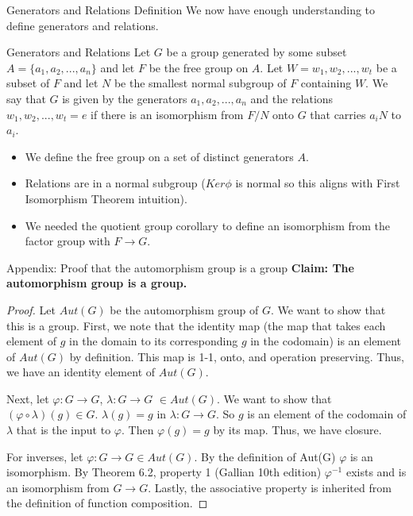 \documentclass{beamer}
\begin{document}
\begin{frame}{Generators and Relations Definition}
    We now have enough understanding to define generators and relations.
    \begin{block}{Generators and Relations}
        Let $G$ be a group generated by some subset $A = \{a_{1}, a_{2}, ..., a_{n}\}$ and let $F$ be the free group on $A$. Let $W = {w_{1}, w_{2}, ..., w_{t}}$ be a subset of $F$ and let $N$ be the smallest normal subgroup of $F$ containing $W$. We say that $G$ is given by the generators $a_{1}, a_{2}, ..., a_{n}$ and the relations $w_{1}, w_{2}, ..., w_{t} = e$ if there is an isomorphism from $F/N$ onto $G$ that carries $a_{i}N$ to $a_{i}$.
    \end{block}

    \pause

    \begin{itemize}
        \item We define the free group on a set of distinct generators $A$.
        \item Relations are in a normal subgroup ($Ker\phi$ is normal so this aligns with First Isomorphism Theorem intuition).
        \item We needed the quotient group corollary to define an isomorphism from the factor group with $F \to G$.
    \end{itemize}
\end{frame}

\begin{frame}{Appendix: Proof that the automorphism group is a group}
\textbf{Claim: The automorphism group is a group.}
    \begin{proof}
        Let $Aut(G)$ be the automorphism group of $G$. We want to show that this is a group. First, we note that the identity map (the map that takes each element of $g$ in the domain to its corresponding $g$ in the codomain) is an element of $Aut(G)$ by definition. This map is 1-1, onto, and operation preserving. Thus, we have an identity element of $Aut(G)$.

        Next, let $\varphi: G \to G$, $\lambda: G \to G$ $\in Aut(G)$. We want to show that $(\varphi \circ \lambda)(g) \in G$. $\lambda (g) = g$ in $\lambda: G \to G$. So $g$ is an element of the codomain of $\lambda$ that is the input to $\varphi$. Then $\varphi(g) = g$ by its map. Thus, we have closure.

        For inverses, let $\varphi: G \to G \in Aut(G)$. By the definition of Aut(G) $\varphi$ is an isomorphism. By Theorem 6.2, property 1 (Gallian 10th edition) $\varphi^{-1}$ exists and is an isomorphism from $G \to G$. Lastly, the associative property is inherited from the definition of function composition.
    \end{proof}
\end{frame}
\end{document}
